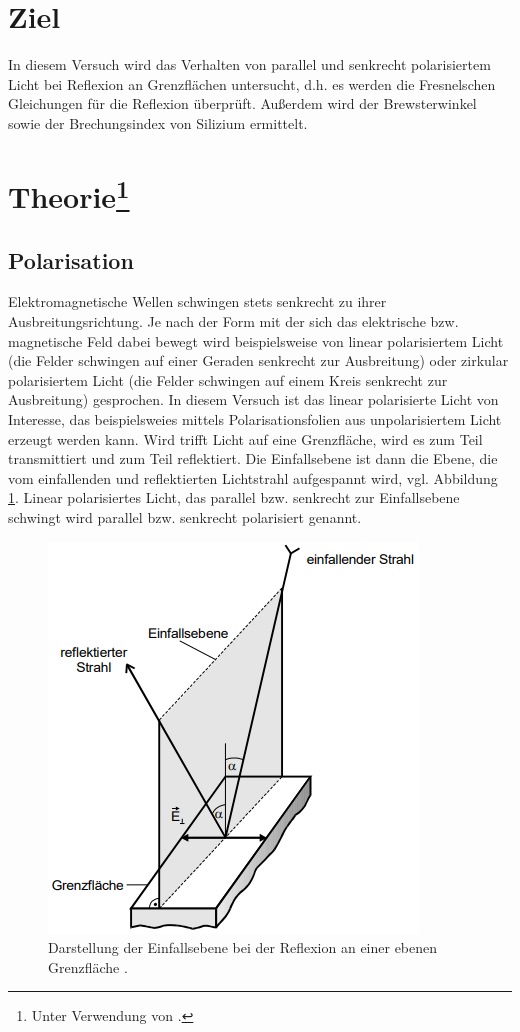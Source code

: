 \section{Ziel}
In diesem Versuch wird das Verhalten von parallel und senkrecht polarisiertem Licht bei Reflexion an Grenzflächen untersucht,
d.h. es werden die Fresnelschen Gleichungen für die Reflexion überprüft.
Außerdem wird der Brewsterwinkel sowie der Brechungsindex von Silizium ermittelt.


\section[Theorie]{Theorie\footnote[1]{Unter Verwendung von \cite{man:v407}.}}

\subsection{Polarisation}
Elektromagnetische Wellen schwingen stets senkrecht zu ihrer Ausbreitungsrichtung.
Je nach der Form mit der sich das elektrische bzw. magnetische Feld dabei bewegt
wird beispielsweise von linear polarisiertem Licht (die Felder schwingen auf einer Geraden senkrecht zur Ausbreitung)
oder zirkular polarisiertem Licht (die Felder schwingen auf einem Kreis senkrecht zur Ausbreitung) gesprochen.
In diesem Versuch ist das linear polarisierte Licht von Interesse, das beispielsweies mittels Polarisationsfolien aus unpolarisiertem Licht erzeugt werden kann.
Wird trifft Licht auf eine Grenzfläche, wird es zum Teil transmittiert und zum Teil reflektiert.
Die Einfallsebene ist dann die Ebene, die vom einfallenden und reflektierten Lichtstrahl aufgespannt wird, vgl. Abbildung \ref{fig:einfallsebene}.
Linear polarisiertes Licht, das parallel bzw. senkrecht zur Einfallsebene schwingt wird parallel bzw. senkrecht polarisiert genannt.


\begin{figure}
    \centering
    \includegraphics[height = 6 cm]{Abbildungen/einfallsebene.png}
    \caption{Darstellung der Einfallsebene bei der Reflexion an einer ebenen Grenzfläche \cite{man:v407}.}
    \label{fig:einfallsebene}
\end{figure}

